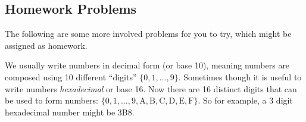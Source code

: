

\subsection*{Homework Problems}

The following are some more involved problems for you to try, which might be assigned as homework.

\begin{questions}

\question We usually write numbers in decimal form (or base 10), meaning numbers are composed using 10 different ``digits'' $\{0,1,\ldots, 9\}$.  Sometimes though it is useful to write numbers {\em hexadecimal} or base 16.  Now there are 16 distinct digits that can be used to form numbers: $\{0, 1, \ldots, 9, \mathrm{A, B, C, D, E, F}\}$.  So for example, a 3 digit hexadecimal number might be 3B8.
\end{questions}
